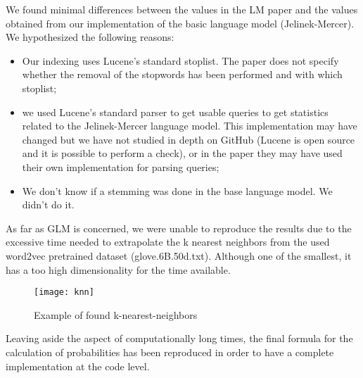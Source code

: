 We found minimal differences between the values ​​in the LM paper and the values ​​obtained from our implementation of the basic language model (Jelinek-Mercer).
We hypothesized the following reasons:
\begin{itemize}
\item Our indexing uses Lucene's standard stoplist. The paper does not specify whether the removal of the stopwords has been performed and with which stoplist;
\item we used Lucene's standard parser to get usable queries to get statistics related to the Jelinek-Mercer language model. This implementation may have changed but we have not studied in depth on GitHub (Lucene is open source and it is possible to perform a check), or in the paper they may have used their own implementation for parsing queries;
\item We don't know if a stemming was done in the base language model. We didn't do it.
\end{itemize}

As far as GLM is concerned, we were unable to reproduce the results due to the excessive time needed to extrapolate the k nearest neighbors from the used word2vec pretrained dataset (glove.6B.50d.txt). Although one of the smallest, it has a too high dimensionality for the time available.

\begin{figure}[H]
    \centering
    \texttt{[image: knn]}
    \caption[Knn]{Example of found k-nearest-neighbors}
    \label{fig:query}
\end{figure}

Leaving aside the aspect of computationally long times, the final formula for the calculation of probabilities has been reproduced in order to have a complete implementation at the code level.